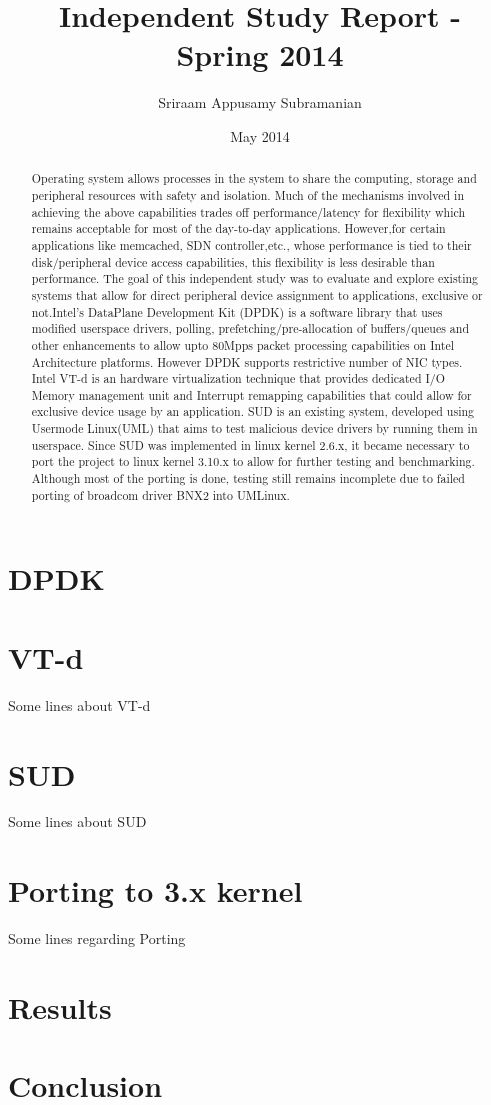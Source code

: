 \documentclass[12pt,titlepage,a4paper]{article}
\begin{document}
\title{Independent Study Report - Spring 2014}
\author{Sriraam Appusamy Subramanian}
\date{May 2014}
\maketitle

\begin{abstract}
Operating system allows processes in the system to share the computing, storage and peripheral resources with safety and isolation. Much of the mechanisms involved in achieving the above capabilities trades off performance/latency for flexibility which remains acceptable for most of the day-to-day applications. However,for certain applications like memcached, SDN controller,etc., whose performance is tied to their disk/peripheral device access capabilities, this flexibility is less desirable than performance. The goal of this independent study was to evaluate and explore existing systems that allow for direct peripheral device assignment to applications, exclusive or not.Intel's DataPlane Development Kit (DPDK) is a software library that uses modified userspace drivers, polling, prefetching/pre-allocation of buffers/queues and other enhancements to allow upto 80Mpps packet processing capabilities on Intel Architecture platforms. However DPDK supports restrictive number of NIC types.  Intel VT-d is an hardware virtualization technique that provides dedicated I/O Memory management unit and Interrupt remapping capabilities that could allow for exclusive device usage by an application. SUD is an existing system, developed using Usermode Linux(UML) that aims to test malicious device drivers by running them in userspace. Since SUD was implemented in linux kernel 2.6.x, it became necessary to port the project to linux kernel 3.10.x to allow for further testing and benchmarking. Although most of the porting is done, testing still remains incomplete due to failed porting of broadcom driver BNX2 into UMLinux. 
\end{abstract}

\section{DPDK}

\section{VT-d}
Some lines about VT-d
\section{SUD}
Some lines about SUD
\section{Porting to 3.x kernel}
Some lines regarding Porting 
\section{Results}

\section{Conclusion}
\end{document}
